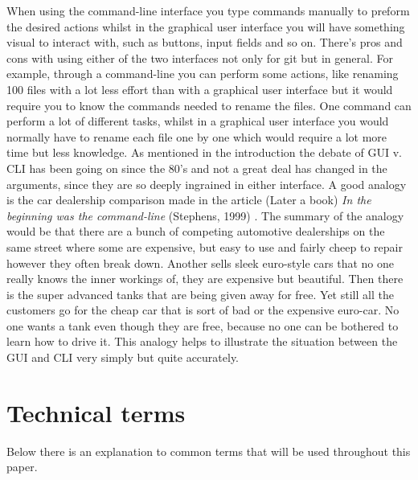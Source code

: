 \documentclass[a4paper,oneside]{bth} %
\begin{document}
			When using the command-line interface you type commands manually to preform the desired actions whilst in the graphical user interface you will have something visual to interact with, such as buttons, input fields and so on.
			There's pros and cons with using either of the two interfaces not only for git but in general.
			For example, through a command-line you can perform some actions, like renaming 100 files with a lot less effort than with a graphical user interface but it would require you to know the commands needed to rename the files. One command can perform a lot of different tasks, whilst in a graphical user interface you would normally have to rename each file one by one which would require a lot more time but less knowledge. As mentioned in the introduction the debate of GUI v. CLI has been going on since the 80's and not a great deal has changed in the arguments, since they are so deeply ingrained in either interface. 
			A good analogy is the car dealership comparison made in the article (Later a book) \textit{In the beginning was the command-line} (Stephens, 1999) \cite{InTheBeginning}. The summary of the analogy would be that there are a bunch of competing automotive dealerships on the same street where some are expensive, but easy to use and fairly cheep to repair however they often break down. Another sells sleek euro-style cars that no one really knows the inner workings of, they are expensive but beautiful. Then there is the super advanced tanks that are being given away for free. Yet still all the customers go for the cheap car that is sort of bad or the expensive euro-car. No one wants a tank even though they are free, because no one can be bothered to learn how to drive it. 
			This analogy helps to illustrate the situation between the GUI and CLI very simply but quite accurately. 
			
			\section{Technical terms}
			Below there is an explanation to common terms that will be used throughout this paper.
			
\end{document}
